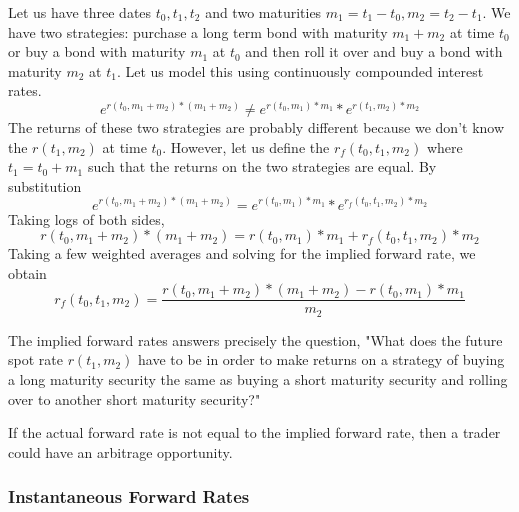 \documentclass[12pt]{scrartcl}
\begin{document}
{\begin{example}
    Let us have three dates $t_0, t_1, t_2$ and two maturities $m_1 = t_1 - t_0, m_2 = t_2 - t_1$. We have two strategies: purchase a long term bond with maturity $m_1 + m_2$ at time $t_0$ or buy a bond with maturity $m_1$ at $t_0$ and then roll it over and buy a bond with maturity $m_2$ at $t_1$. Let us model this using continuously compounded interest rates.
    \[e^{r(t_0, m_1 + m_2) * (m_1 + m_2) } \neq e^{r(t_0, m_1) * m_1} * e^{r(t_1, m_2) * m_2}\]
    The returns of these two strategies are probably different because we don't know the  $r(t_1, m_2)$ at time $t_0$. However, let us define the  $r_f(t_0, t_1, m_2)$ where $t_1 = t_0 + m_1$ such that the returns on the two strategies are equal. By substitution
    \[e^{r(t_0, m_1 + m_2) * (m_1 + m_2) } = e^{r(t_0, m_1) * m_1} * e^{r_f(t_0, t_1, m_2) * m_2}\]
    Taking logs of both sides, 
    \[r(t_0, m_1 + m_2) * (m_1 + m_2)= r(t_0, m_1) * m_1 + r_f(t_0, t_1, m_2) * m_2\]
    Taking a few weighted averages and solving for the implied forward rate, we obtain
    \[r_f(t_0, t_1, m_2) = \dfrac{r(t_0, m_1 + m_2) * (m_1 + m_2) - r(t_0, m_1) * m_1}{m_2}\]
    \begin{note}
    The implied forward rates answers precisely the question, "What does the future spot rate $r(t_1, m_2)$
     have to be in order to make returns on a strategy of buying a long maturity security the same as buying a short maturity security and rolling over to another short maturity security?"
    \end{note}
    
\end{example}

If the actual forward rate is not equal to the implied forward rate, then a trader could have an arbitrage opportunity.

\subsubsection{Instantaneous Forward Rates}


}
\end{document}
